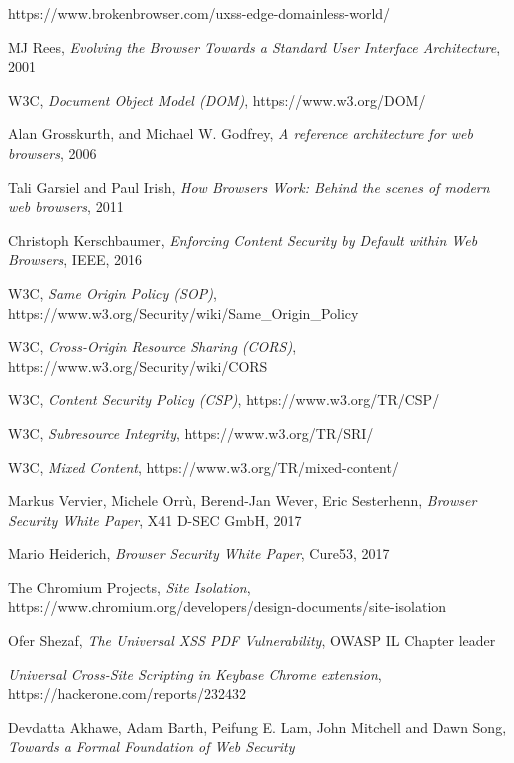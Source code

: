 \documentclass[journal]{IEEEtran}
\begin{document}
\begin{thebibliography}{1}

https://www.brokenbrowser.com/uxss-edge-domainless-world/

MJ Rees,
\textit{Evolving the Browser Towards a Standard User Interface Architecture}, 2001

W3C,
\textit{Document Object Model (DOM)},
https://www.w3.org/DOM/

Alan Grosskurth, and Michael W. Godfrey,
\textit{A reference architecture for web browsers}, 2006

Tali Garsiel and Paul Irish,
\textit{How Browsers Work: Behind the scenes of modern web browsers}, 2011

Christoph Kerschbaumer,
\textit{Enforcing Content Security by Default within Web Browsers}, IEEE, 2016

W3C,
\textit{Same Origin Policy (SOP)},
https://www.w3.org/Security/wiki/Same\_Origin\_Policy

W3C,
\textit{Cross-Origin Resource Sharing (CORS)},
https://www.w3.org/Security/wiki/CORS

W3C,
\textit{Content Security Policy (CSP)},
https://www.w3.org/TR/CSP/

W3C,
\textit{Subresource Integrity},
https://www.w3.org/TR/SRI/

W3C,
\textit{Mixed Content},
https://www.w3.org/TR/mixed-content/

Markus Vervier, Michele Orrù, Berend-Jan Wever, Eric Sesterhenn,
\textit{Browser Security White Paper},
X41 D-SEC GmbH, 2017
 
 
Mario Heiderich,
\textit{Browser Security White Paper},
Cure53, 2017

The Chromium Projects,
\textit{Site Isolation},
https://www.chromium.org/developers/design-documents/site-isolation

Ofer Shezaf,
\textit{The Universal XSS PDF Vulnerability},
OWASP IL Chapter leader

\textit{Universal Cross-Site Scripting in Keybase Chrome extension},
https://hackerone.com/reports/232432
 
Devdatta Akhawe, Adam Barth, Peifung E. Lam, John Mitchell and Dawn Song,
\textit{Towards a Formal Foundation of Web Security}
 

\end{thebibliography}
\end{document}
